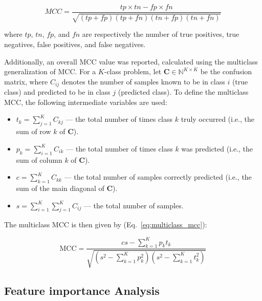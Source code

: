 \documentclass{bachelor2025eng}
\begin{document}
            \begin{equation}
            \label{eq:binary_mcc}
            MCC = \frac{tp \times tn - fp \times fn}{\sqrt{(tp + fp)(tp + fn)(tn + fp)(tn + fn)}}
            \end{equation}
            
            \noindent
            where \( tp \), \( tn \), \( fp \), and \( fn \) are respectively the number of true positives, true negatives, false positives, and false negatives. 
            
            Additionally, an overall MCC value was reported, calculated using the multiclass generalization of MCC. For a \(K\)-class problem, let \(\mathbf{C} \in \mathbb{N}^{K \times K}\) be the confusion matrix, where \(C_{ij}\) denotes the number of samples known to be in class \(i\) (true class) and predicted to be in class \(j\) (predicted class). To define the multiclass MCC, the following intermediate variables are used:
            \begin{itemize}
                \item \( t_k = \sum_{j=1}^{K} C_{kj} \) --- the total number of times class \(k\) truly occurred (i.e., the sum of row \(k\) of \(\mathbf{C}\)).
               \item \( p_k = \sum_{i=1}^{K} C_{ik} \) --- the total number of times class \(k\) was predicted (i.e., the sum of column \(k\) of \(\mathbf{C}\)).
               \item \( c = \sum_{k=1}^{K} C_{kk} \) --- the total number of samples correctly predicted (i.e., the sum of the main diagonal of \(\mathbf{C}\)).
               \item \( s = \sum_{i=1}^{K} \sum_{j=1}^{K} C_{ij} \) --- the total number of samples.
            \end{itemize}
            
            \noindent
            The multiclass MCC is then given by (Eq.~\ref{eq:multiclass_mcc}):
            
            \begin{equation}
            \label{eq:multiclass_mcc}
            \text{MCC} = \frac{
               c s - \sum_{k=1}^{K} p_k t_k
            }{\sqrt{
               \left(s^2 - \sum_{k=1}^{K} p_k^2\right)
               \left(s^2 - \sum_{k=1}^{K} t_k^2\right)
            }}
            \end{equation}

        \subsection{Feature importance Analysis}
            
\end{document}
